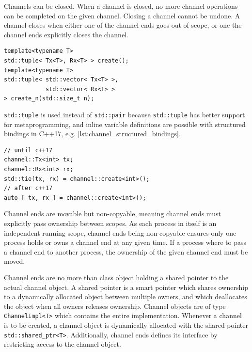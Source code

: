 Channels can be closed. When a channel is closed, no more channel operations can be completed on the given channel. Closing a channel cannot be undone. A channel closes when either one of the channel ends goes out of scope, or one the channel ends explicitly closes the channel.

\begin{lstfloat}
\begin{lstlisting}[caption={Channel create functions.}, label={lst:channel_create_functions}, style={CustomC++}, xleftmargin={4em}]
template<typename T>
std::tuple< Tx<T>, Rx<T> > create();
template<typename T>
std::tuple< std::vector< Tx<T> >, 
            std::vector< Rx<T> >
> create_n(std::size_t n);
\end{lstlisting}
\end{lstfloat}

\texttt{std::tuple} is used instead of \texttt{std::pair} because \texttt{std::tuple} has better support for metaprogramming, and inline variable definitions are possible with structured bindings in C++17, e.g. \cref{lst:channel_structured_bindings}.

\begin{lstfloat}
\begin{lstlisting}[caption={Creating channels with structured bindings.}, label={lst:channel_structured_bindings}, style={CustomC++}, xleftmargin={4em}]
// until c++17
channel::Tx<int> tx;
channel::Rx<int> rx;
std::tie(tx, rx) = channel::create<int>();
// after c++17
auto [ tx, rx ] = channel::create<int>();
\end{lstlisting}
\end{lstfloat}

Channel ends are movable but non\hyp{}copyable, meaning channel ends must explicitly pass ownership between scopes. As each process in itself is an independent running scope, channel ends being non\hyp{}copyable ensures only one process holds or owns a channel end at any given time. If a process where to pass a channel end to another process, the ownership of the given channel end must be moved.

Channel ends are no more than class object holding a shared pointer to the actual channel object. A shared pointer is a smart pointer which shares ownership to a dynamically allocated object between multiple owners, and which deallocates the object when all owners releases ownership. Channel objects are of type \texttt{ChannelImpl<T>} which contains the entire implementation. Whenever a channel is to be created, a channel object is dynamically allocated with the shared pointer \texttt{std::shared\_ptr<T>}. Additionally, channel ends defines its interface by restricting access to the channel object.

